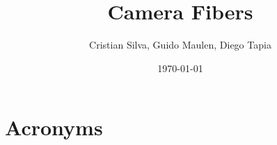 \documentclass[PMO,authoryear,toc]{lsstdoc}
\title{Camera Fibers}
\author{%
Cristian Silva, Guido Maulen, Diego Tapia
}
\date {\today}
\begin{document}
\maketitle




\appendix
\renewcommand{\refname}{} %


\section{Acronyms} \label{sec:acronyms}

\end{document}
